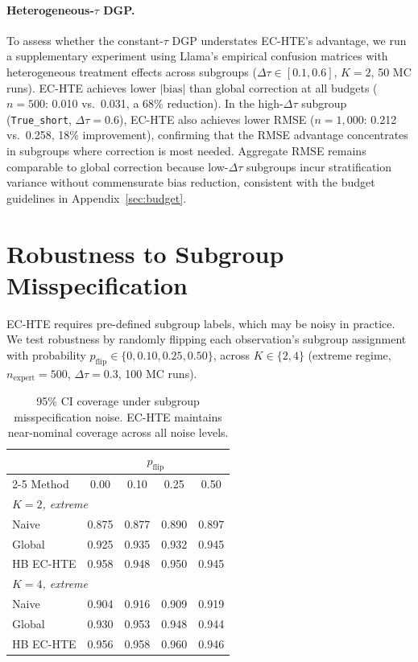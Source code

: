 \paragraph{Heterogeneous-$\tau$ DGP.}
To assess whether the constant-$\tau$ DGP understates EC-HTE's advantage, we run a supplementary experiment using Llama's empirical confusion matrices with heterogeneous treatment effects across subgroups ($\Delta\tau \in [0.1, 0.6]$, $K{=}2$, 50 MC runs).
EC-HTE achieves lower $|\text{bias}|$ than global correction at all budgets ($n{=}500$: 0.010 vs.\ 0.031, a 68\% reduction).
In the high-$\Delta\tau$ subgroup (\texttt{True\_short}, $\Delta\tau{=}0.6$), EC-HTE also achieves lower RMSE ($n{=}1{,}000$: 0.212 vs.\ 0.258, 18\% improvement), confirming that the RMSE advantage concentrates in subgroups where correction is most needed.
Aggregate RMSE remains comparable to global correction because low-$\Delta\tau$ subgroups incur stratification variance without commensurate bias reduction, consistent with the budget guidelines in Appendix~\ref{sec:budget}.

\section{Robustness to Subgroup Misspecification}
\label{app:robustness}

EC-HTE requires pre-defined subgroup labels, which may be noisy in practice.
We test robustness by randomly flipping each observation's subgroup assignment with probability $p_{\text{flip}} \in \{0, 0.10, 0.25, 0.50\}$, across $K \in \{2, 4\}$ (extreme regime, $n_{\text{expert}} = 500$, $\Delta\tau = 0.3$, 100 MC runs).

\begin{table}[t]
\centering
\caption{95\% CI coverage under subgroup misspecification noise. EC-HTE maintains near-nominal coverage across all noise levels.}
\label{tab:robustness}
\small
\begin{tabular}{lcccc}
\toprule
& \multicolumn{4}{c}{$p_{\text{flip}}$} \\
\cmidrule(lr){2-5}
Method & 0.00 & 0.10 & 0.25 & 0.50 \\
\midrule
\multicolumn{5}{l}{\textit{$K{=}2$, extreme}} \\
\quad Naive & 0.875 & 0.877 & 0.890 & 0.897 \\
\quad Global & 0.925 & 0.935 & 0.932 & 0.945 \\
\quad HB EC-HTE & 0.958 & 0.948 & 0.950 & 0.945 \\
\midrule
\multicolumn{5}{l}{\textit{$K{=}4$, extreme}} \\
\quad Naive & 0.904 & 0.916 & 0.909 & 0.919 \\
\quad Global & 0.930 & 0.953 & 0.948 & 0.944 \\
\quad HB EC-HTE & 0.956 & 0.958 & 0.960 & 0.946 \\
\bottomrule
\end{tabular}
\end{table}

